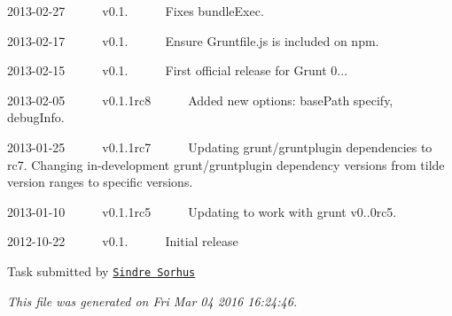 \begin{DoxyItemize}
\item 2013-\/02-\/27   v0.1.   \+Fixes bundle\+Exec.
\item 2013-\/02-\/17   v0.1.   \+Ensure Gruntfile.\+js is included on npm.
\item 2013-\/02-\/15   v0.1.   \+First official release for Grunt 0...
\item 2013-\/02-\/05   v0.1.\+1rc8   \+Added new options\+: base\+Path specify, debug\+Info.
\item 2013-\/01-\/25   v0.1.\+1rc7   \+Updating grunt/gruntplugin dependencies to rc7. Changing in-\/development grunt/gruntplugin dependency versions from tilde version ranges to specific versions.
\item 2013-\/01-\/10   v0.1.\+1rc5   \+Updating to work with grunt v0..\+0rc5.
\item 2012-\/10-\/22   v0.1.   \+Initial release 


\end{DoxyItemize}

Task submitted by \href{http://github.com/sindresorhus}{\tt Sindre Sorhus}

{\itshape This file was generated on Fri Mar 04 2016 16\+:24\+:46.} 